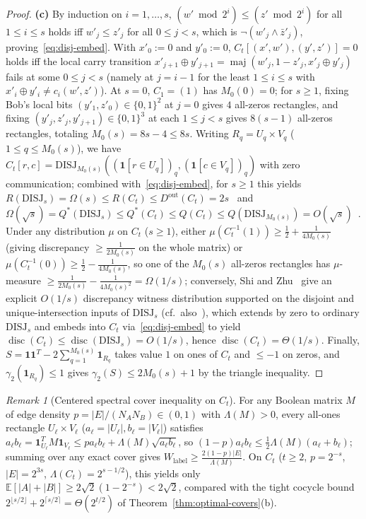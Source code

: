 \documentclass[11pt,reqno]{amsart}
\theoremstyle{definition}
\theoremstyle{remark}
\newtheorem{remark}[theorem]{Remark}
\DeclareMathOperator{\disc}{disc}
\DeclareMathOperator{\maj}{maj}
\newcommand{\EE}{\mathbb{E}}
\newcommand{\ind}{\mathbf{1}}
\newcommand{\DISJ}{\mathrm{DISJ}}
\numberwithin{equation}{section}
\begin{document}
\begin{proof}
\medskip
\noindent\textbf{(c)} By induction on $i = 1, \dots, s$, $(w' \bmod 2^i) \le (z' \bmod 2^i)$ for all $1 \le i \le s$ holds iff $w'_j \le z'_j$ for all $0 \le j < s$, which is $\neg(w'_j \land \bar{z}'_j)$, proving~\eqref{eq:disj-embed}. With $x'_0 := 0$ and $y'_0 := 0$, $C_t[(x', w'), (y', z')] = 0$ holds iff the local carry transition $x'_{j+1} \oplus y'_{j+1} = \maj(w'_j, 1 - z'_j, x'_j \oplus y'_j)$ fails at some $0 \le j < s$ (namely at $j = i - 1$ for the least $1 \le i \le s$ with $x'_i \oplus y'_i \neq c_i(w', z')$). At $s = 0$, $C_1 = (1)$ has $M_0(0) = 0$; for $s \ge 1$, fixing Bob's local bits $(y'_1, z'_0) \in \{0, 1\}^2$ at $j = 0$ gives $4$ all-zeros rectangles, and fixing $(y'_j, z'_j, y'_{j+1}) \in \{0, 1\}^3$ at each $1 \le j < s$ gives $8(s - 1)$ all-zeros rectangles, totaling $M_0(s) = 8s - 4 \le 8s$. Writing $R_q = U_q \times V_q$ ($1 \le q \le M_0(s)$), we have $C_t[r, c] = \DISJ_{M_0(s)}((\ind[r \in U_q])_q, (\ind[c \in V_q])_q)$ with zero communication; combined with~\eqref{eq:disj-embed}, for $s \ge 1$ this yields $R(\DISJ_s) = \Omega(s) \le R(C_t) \le D^{\mathrm{out}}(C_t) = 2s$~\cite{Raz92} and $\Omega(\sqrt{s}) = Q^*(\DISJ_s) \le Q^*(C_t) \le Q(C_t) \le Q(\DISJ_{M_0(s)}) = O(\sqrt{s})$~\cite{Raz03,LS09,AA05}. Under any distribution $\mu$ on $C_t$ ($s \ge 1$), either $\mu(C_t^{-1}(1)) \ge \frac{1}{2} + \frac{1}{4M_0(s)}$ (giving discrepancy $\ge \frac{1}{2M_0(s)}$ on the whole matrix) or $\mu(C_t^{-1}(0)) \ge \frac{1}{2} - \frac{1}{4M_0(s)}$, so one of the $M_0(s)$ all-zeros rectangles has $\mu$-measure $\ge \frac{1}{2M_0(s)} - \frac{1}{4M_0(s)^2} = \Omega(1/s)$; conversely, Shi and Zhu~\cite[Appendix~B]{SZ09} give an explicit $O(1/s)$ discrepancy witness distribution supported on the disjoint and unique-intersection inputs of $\DISJ_s$ (cf.\ also~\cite{KN97,LS09}), which extends by zero to ordinary $\DISJ_s$ and embeds into $C_t$ via~\eqref{eq:disj-embed} to yield $\disc(C_t) \le \disc(\DISJ_s) = O(1/s)$, hence $\disc(C_t) = \Theta(1/s)$. Finally, $S = \ind\ind^T - 2\sum_{q=1}^{M_0(s)} \ind_{R_q}$ takes value $1$ on ones of $C_t$ and $\le -1$ on zeros, and $\gamma_2(\ind_{R_q}) \le 1$ gives $\gamma_2(S) \le 2 M_0(s) + 1$ by the triangle inequality.
\end{proof}

\begin{remark}[Centered spectral cover inequality on $C_t$]
  \label{rem:spectral-cover}
  For any Boolean matrix $M$ of edge density $p = |E|/(N_A N_B) \in (0, 1)$ with $\Lambda(M) > 0$, every all-ones rectangle $U_\ell \times V_\ell$ ($a_\ell = |U_\ell|, b_\ell = |V_\ell|$) satisfies $a_\ell b_\ell = \ind_{U_\ell}^T M \ind_{V_\ell} \le p a_\ell b_\ell + \Lambda(M)\sqrt{a_\ell b_\ell}$, so $(1 - p)a_\ell b_\ell \le \frac{1}{2}\Lambda(M)(a_\ell + b_\ell)$; summing over any exact cover gives $W_{\mathrm{label}} \ge \frac{2(1 - p)|E|}{\Lambda(M)}$. On $C_t$ ($t \ge 2$, $p = 2^{-s}$, $|E| = 2^{3s}$, $\Lambda(C_t) = 2^{s-1/2}$), this yields only $\EE[|A| + |B|] \ge 2\sqrt{2}(1 - 2^{-s}) < 2\sqrt{2}$, compared with the tight cocycle bound $2^{\lfloor s/2 \rfloor} + 2^{\lceil s/2 \rceil} = \Theta(2^{t/2})$ of Theorem~\ref{thm:optimal-covers}(b).
\end{remark}
\end{document}
